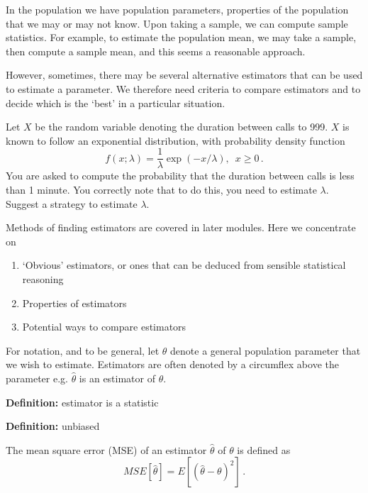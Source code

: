 \documentclass[12pt]{article}
\newenvironment{definition}[1][Definition:]{\begin{trivlist}
\item[\hskip \labelsep {\bfseries #1}]}{\end{trivlist}}
\newenvironment{example}[1][Example:]{\begin{trivlist}
\item[\hskip \labelsep {\bfseries #1}]}{\end{trivlist}}
\begin{document}
In the population we have population parameters, properties of the population that we may or may not know. Upon taking a sample, we can compute sample statistics. For example, to estimate the population mean, we may take a sample, then compute a sample mean, and this seems a reasonable approach.

However, sometimes, there may be several alternative estimators that can be used to estimate a parameter. We therefore need criteria to compare estimators and to decide which is the `best' in a particular situation.

\begin{example}
Let $X$ be the random variable denoting the duration between calls to 999. $X$ is known to follow an exponential distribution, with probability density function
\begin{equation*}
f(x;\lambda)=\frac{1}{\lambda}\exp(-x/\lambda), \,\,\, x \geq 0 \, .
\end{equation*}
You are asked to compute the probability that the duration between calls is less than 1 minute. You correctly note that to do this, you need to estimate $\lambda$. Suggest a strategy to estimate $\lambda$.
\end{example}

Methods of finding estimators are covered in later modules. Here we concentrate on
\begin{enumerate}
\item `Obvious' estimators, or ones that can be deduced from sensible statistical reasoning
\item Properties of estimators
\item Potential ways to compare estimators
\end{enumerate}

For notation, and to be general, let $\theta$ denote a general population parameter that we wish to estimate. Estimators are often denoted by a circumflex above the parameter e.g. $\hat{\theta}$ is an estimator of $\theta$.
\begin{mdframed}
{\bf Definition:}
\textcolor[rgb]{1.00,1.00,1.00}{estimator is a statistic\lipsum[1-2]}
\end{mdframed}

\begin{mdframed}
{\bf Definition:}
\textcolor[rgb]{1.00,1.00,1.00}{unbiased \lipsum[1-2]}
\end{mdframed}

\begin{definition}
The mean square error (MSE) of an estimator $\hat{\theta}$ of $\theta$ is defined as $$MSE[\hat{\theta}]=E \left[(\hat{\theta}-\theta)^{2}\right] \,.$$
\end{definition}
\end{document}
